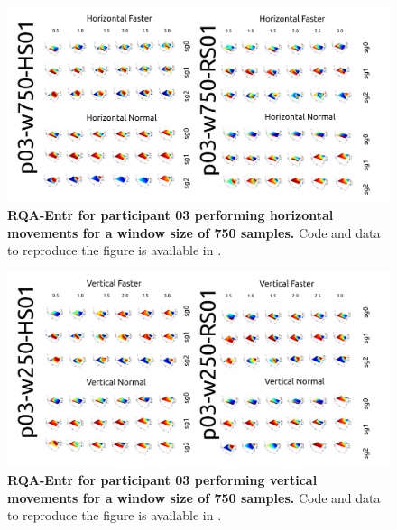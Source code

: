 \documentclass[12pt]{article}
\begin{document}
\newpage
\begin{figure}[ht!]
\centering
\includegraphics{figures/rqa/output/epsilons/rqa-epsilonsp03w750Horizontal}
    	\caption{
	{\bf RQA-Entr for participant 03 performing horizontal movements for a window size of 750 samples.}
	Code and data to reproduce the figure is available in \cite{srep2020}.
        }
    \label{fig-p03-H-w750}
\end{figure}
\begin{figure}[hb!]
\centering
\includegraphics{figures/rqa/output/epsilons/rqa-epsilonsp03w750Vertical}
    	\caption{
	{\bf RQA-Entr for participant 03 performing vertical movements for a window size of 750 samples.}
	Code and data to reproduce the figure is available in \cite{srep2020}.
        }
    \label{fig-p03-V-w750}
\end{figure}
\end{document}
